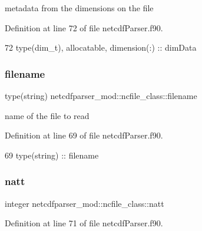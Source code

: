metadata from the dimensions on the file 



Definition at line 72 of file netcdf\+Parser.\+f90.


\begin{DoxyCode}
72         \textcolor{keywordtype}{type}(dim\_t), \textcolor{keywordtype}{allocatable}, \textcolor{keywordtype}{dimension(:)} :: dimData
\end{DoxyCode}
\mbox{\label{structnetcdfparser__mod_1_1ncfile__class_ae3784734e7d33f1c44284a489dc18b8e}} 
\subsubsection{\texorpdfstring{filename}{filename}}
{\footnotesize\ttfamily type(string) netcdfparser\+\_\+mod\+::ncfile\+\_\+class\+::filename\hspace{0.3cm}{\ttfamily [private]}}



name of the file to read 



Definition at line 69 of file netcdf\+Parser.\+f90.


\begin{DoxyCode}
69         \textcolor{keywordtype}{type}(string) :: filename
\end{DoxyCode}
\mbox{\label{structnetcdfparser__mod_1_1ncfile__class_a79568f0aae456c7a278c44a767a7be11}} 
\subsubsection{\texorpdfstring{natt}{natt}}
{\footnotesize\ttfamily integer netcdfparser\+\_\+mod\+::ncfile\+\_\+class\+::natt\hspace{0.3cm}{\ttfamily [private]}}



Definition at line 71 of file netcdf\+Parser.\+f90.

